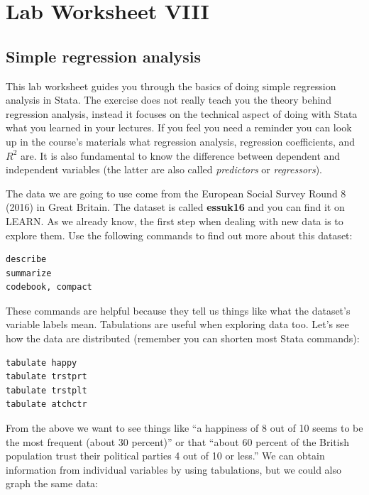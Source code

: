 \documentclass{article}
\begin{document}
\pagestyle{fancy}
\fancyhf{}

\section*{\hfil Lab Worksheet VIII \hfil}
\subsection*{Simple regression analysis}

This lab worksheet guides you through the basics of doing simple regression analysis in Stata. The exercise does not really teach you the theory behind regression analysis, instead it focuses on the technical aspect of doing with Stata what you learned in your lectures. If you feel you need a reminder you can look up in the course's materials what regression analysis, regression coefficients, and $R^2$ are. It is also fundamental to know the difference between dependent and independent variables (the latter are also called \textit{predictors} or \textit{regressors}).

The data we are going to use come from the European Social Survey Round 8 (2016) in Great Britain. The dataset is called \textbf{essuk16} and you can find it on LEARN. As we already know, the first step when dealing with new data is to explore them. Use the following commands to find out more about this dataset:

\begin{lstlisting}
describe
summarize
codebook, compact
\end{lstlisting}

These commands are helpful because they tell us things like what the dataset's variable labels mean. Tabulations are useful when exploring data too. Let's see how the data are distributed (remember you can shorten most Stata commands):

\begin{lstlisting}
tabulate happy
tabulate trstprt
tabulate trstplt
tabulate atchctr
\end{lstlisting}

From the above we want to see things like ``a happiness of 8 out of 10 seems to be the most frequent (about 30 percent)'' or that ``about 60 percent of the British population trust their political parties 4 out of 10 or less.'' We can obtain information from individual variables by using tabulations, but we could also graph the same data:
\end{document}
